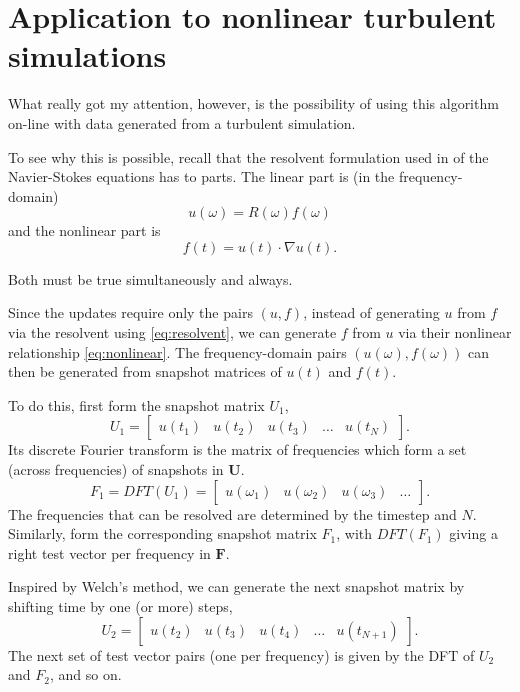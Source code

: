 \documentclass[onecolumn, twoside, 11pt]{article}
\newcommand\mU{\mathbf{U}}
\newcommand\mF{\mathbf{F}}
\begin{document}
\section{Application to nonlinear turbulent simulations}

What really got my attention, however, is the possibility of using this algorithm on-line with data generated from a turbulent simulation.

To see why this is possible, recall that the resolvent formulation used in \cite{McKeon.Sharma:2010} of the Navier-Stokes equations has to parts.
The linear part is (in the frequency-domain)
\begin{equation}
    \label{eq:resolvent}
    u(\omega) = R(\omega)f(\omega)
\end{equation}
and the nonlinear part is
\begin{equation}
    \label{eq:nonlinear}
    f(t) = u(t) \cdot \nabla u(t).
\end{equation}

Both must be true simultaneously and always.

Since the updates require only the pairs $(u,f)$, instead of generating $u$ from $f$ via the resolvent using \eqref{eq:resolvent}, we can generate $f$ from $u$ via their nonlinear relationship \eqref{eq:nonlinear}. The frequency-domain pairs $(u(\omega), f(\omega))$ can then be generated from snapshot matrices of $u(t)$ and $f(t)$.

To do this, first form the snapshot matrix $U_1$,
\[U_1 = \left[
        \begin{array}{ccccc}
            u(t_1) & u(t_2) & u(t_3) & \ldots & u(t_N)
        \end{array}
    \right].
\]
Its discrete Fourier transform is the matrix of frequencies which form a set (across frequencies) of snapshots in $\mU$.
\[ F_1 = DFT(U_1) = \left[
        \begin{array}{ccccc}
            u(\omega_1) & u(\omega_2) & u(\omega_3) & \ldots 
        \end{array}
    \right].
\]
The frequencies that can be resolved are determined by the timestep and $N$.
Similarly, form the corresponding snapshot matrix $F_1$, with $DFT(F_1)$ giving a right test vector per frequency in $\mF$.

Inspired by Welch's method, we can generate the next snapshot matrix by shifting time by one (or more) steps,
\[U_2 = \left[
        \begin{array}{ccccc}
            u(t_2) & u(t_3) & u(t_4) & \ldots & u(t_{N+1})
        \end{array}
    \right].
\]
The next set of test vector pairs (one per frequency) is given by the DFT of $U_2$ and $F_2$, and so on.
\end{document}
